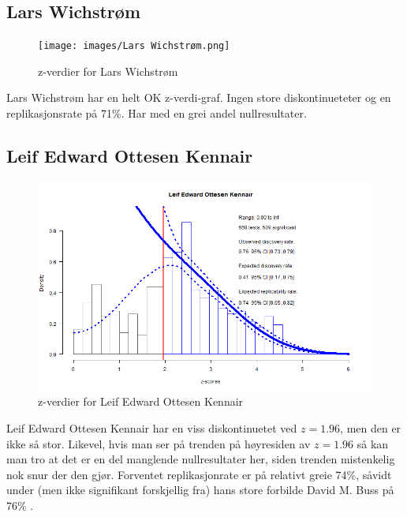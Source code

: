 \documentclass[doc,norsk]{apa7}
\begin{document}
\subsection{Lars Wichstrøm}
\begin{figure}[h!]
    \centering
    \texttt{[image: images/Lars Wichstrøm.png]}
    \caption{z-verdier for Lars Wichstrøm}
\end{figure}
Lars Wichstrøm har en helt OK z-verdi-graf. Ingen store diskontinueteter og en replikasjonsrate på 71\%. Har med en grei andel nullresultater.

\subsection{Leif Edward Ottesen Kennair}
\begin{figure}[h!]
    \centering
    \includegraphics[width=\textwidth]{images/Leif Edward Ottesen Kennair.png}
    \caption{z-verdier for Leif Edward Ottesen Kennair}
\end{figure}
Leif Edward Ottesen Kennair har en viss diskontinuetet ved $z=1.96$, men den er ikke så stor. Likevel, hvis man ser på trenden på høyresiden av $z=1.96$ så kan man tro at det er en del manglende nullresultater her, siden trenden mistenkelig nok snur der den gjør. Forventet replikasjonrate er på relativt greie 74\%, såvidt under (men ikke signifikant forskjellig fra) hans store forbilde David M. Buss på 76\% \parencite{z-curve-david-buss}.
\end{document}
